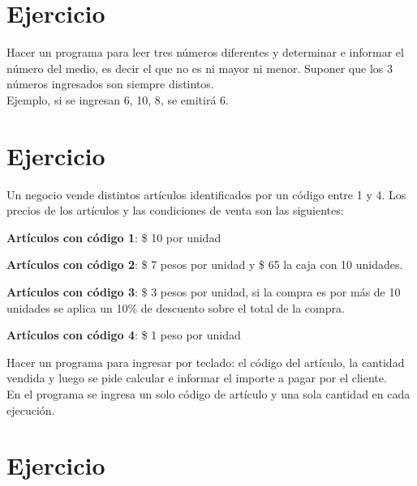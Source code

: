 \documentclass[12pt,a4paper,twoside]{article}
\begin{document}
\newpage

\section{Ejercicio }

\hspace*{1cm}Hacer un programa para leer tres números diferentes y determinar e informar el número del medio, es decir el que no es ni mayor ni menor. Suponer que los 3 números ingresados son siempre distintos.\\
Ejemplo, si se ingresan 6, 10, 8, se emitirá 6.

\newpage

\section{Ejercicio }

\hspace*{1cm}Un negocio vende distintos artículos identificados por un código entre 1 y 4. Los precios de los artículos y las condiciones de venta son las siguientes:
\begin{list}{•}{}
\item \textbf{Artículos con código 1}: \$ 10 por unidad
\item \textbf{Artículos con código 2}: \$ 7 pesos por unidad y \$ 65 la caja con 10 unidades.
\item \textbf{Artículos con código 3}: \$ 3 pesos por unidad, si la compra es por más de 10 unidades se aplica un 10\% de descuento sobre el total de la compra.
\item \textbf{Artículos con código 4}: \$ 1 peso por unidad
\end{list}
Hacer un programa para ingresar por teclado: el código del artículo, la cantidad vendida y luego se pide calcular e informar el importe a pagar por el cliente.\\
En el programa se ingresa un solo código de artículo y una sola cantidad en cada ejecución.

\newpage{\ }
\newpage{\ }

\section{Ejercicio }
\end{document}
